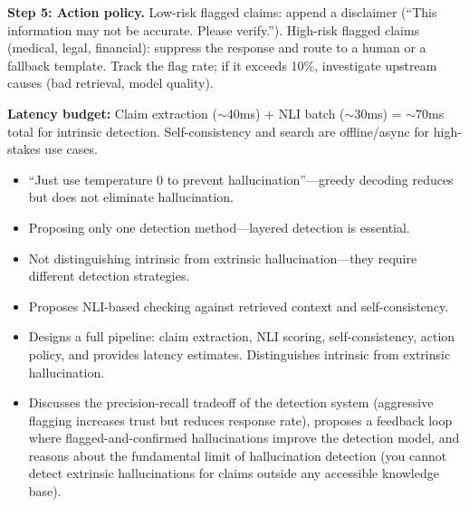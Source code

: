 \begin{interviewq}
\textbf{Step 5: Action policy.} Low-risk flagged claims: append a disclaimer (``This information may not be accurate. Please verify.''). High-risk flagged claims (medical, legal, financial): suppress the response and route to a human or a fallback template. Track the flag rate; if it exceeds 10\%, investigate upstream causes (bad retrieval, model quality).

\textbf{Latency budget:} Claim extraction ($\sim$40ms) + NLI batch ($\sim$30ms) = $\sim$70ms total for intrinsic detection. Self-consistency and search are offline/async for high-stakes use cases.

\redflags
\begin{itemize}
    \item ``Just use temperature 0 to prevent hallucination''---greedy decoding reduces but does not eliminate hallucination.
    \item Proposing only one detection method---layered detection is essential.
    \item Not distinguishing intrinsic from extrinsic hallucination---they require different detection strategies.
\end{itemize}


\goodgreat
\begin{itemize}
    \item {} Proposes NLI-based checking against retrieved context and self-consistency.
    \item {} Designs a full pipeline: claim extraction, NLI scoring, self-consistency, action policy, and provides latency estimates. Distinguishes intrinsic from extrinsic hallucination.
    \item {} Discusses the precision-recall tradeoff of the detection system (aggressive flagging increases trust but reduces response rate), proposes a feedback loop where flagged-and-confirmed hallucinations improve the detection model, and reasons about the fundamental limit of hallucination detection (you cannot detect extrinsic hallucinations for claims outside any accessible knowledge base).
\end{itemize}

\end{interviewq}


